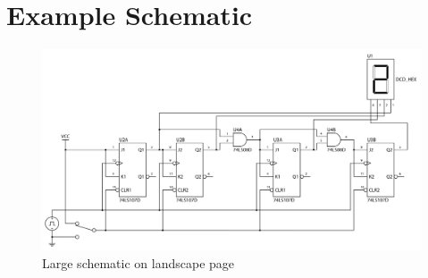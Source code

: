 \chapter{Example Schematic}\label{appendixb}
\begin{figure}
  \centering
  \includegraphics[width=\textheight]{figs/schematic.png}
  \caption{Large schematic on landscape page}
  \label{fig:sche}
\end{figure}
